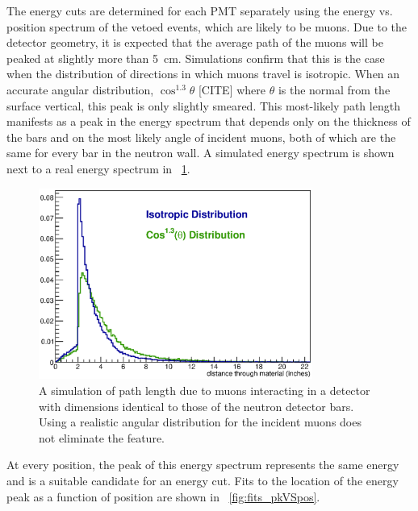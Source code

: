 The energy cuts are determined for each PMT separately using the energy vs. position spectrum of the vetoed events, which are likely to be muons.  Due to the detector geometry, it is expected that the average path of the muons will be peaked at slightly more than 5~cm.  Simulations confirm that this is the case when the distribution of directions in which muons travel is isotropic.  When an accurate angular distribution, $\cos^{1.3}{\theta}$ [CITE] where $\theta$ is the normal from the surface vertical, this peak is only slightly smeared. This most-likely path length manifests as a peak in the energy spectrum that depends only on the thickness of the bars and on the most likely angle of incident muons, both of which are the same for every bar in the neutron wall.  A simulated energy spectrum is shown next to a real energy spectrum in {\fig}~\ref{fig:muonSpectrum}. 
\begin{figure}[!htbp]
\centering
\includegraphics[width=0.8\textwidth]{figures/flatVSaccurate_cosmicDist.eps}
\caption{A simulation of path length due to muons interacting in a detector with dimensions identical to those of the neutron detector bars.  Using a realistic angular distribution for the incident muons does not eliminate the feature.}
\label{fig:muonSpectrum}
\end{figure}
At every position, the peak of this energy spectrum represents the same energy and is a suitable candidate for an energy cut.  Fits to the location of the energy peak as a function of position are shown in {\fig}~\ref{fig:fits_pkVSpos}.
